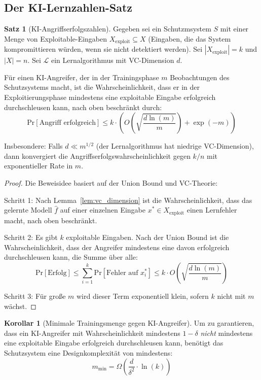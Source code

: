 \documentclass[a4paper,12pt]{article}
\theoremstyle{definition}
\newtheorem{satz}{Satz}
\newtheorem{korollar}{Korollar}
\begin{document}
\subsection{Der KI-Lernzahlen-Satz}

\begin{satz}[KI-Angriffserfolgszahlen]
\label{satz:ki_lernschranke}
Gegeben sei ein Schutzmsystem $S$ mit einer Menge von Exploitable-Eingaben $X_{\mathrm{exploit}} \subseteq X$ (Eingaben, die das System kompromittieren würden, wenn sie nicht detektiert werden). Sei $|X_{\mathrm{exploit}}| = k$ und $|X| = n$. Sei $\mathcal{L}$ ein Lernalgorithmus mit VC-Dimension $d$.

Für einen KI-Angreifer, der in der Trainingsphase $m$ Beobachtungen des Schutzsystems macht, ist die Wahrscheinlichkeit, dass er in der Exploitierungsphase mindestens eine exploitable Eingabe erfolgreich durchschleusen kann, nach oben beschränkt durch:
\begin{equation}
\mathrm{Pr}[\text{Angriff erfolgreich}] \leq k \cdot \left( O\left(\sqrt{\frac{d \ln(m)}{m}}\right) + \exp(-m) \right)
\end{equation}

Insbesondere: Falls $d \ll m^{1/2}$ (der Lernalgorithmus hat niedrige VC-Dimension), dann konvergiert die Angriffserfolgswahrscheinlichkeit gegen $k / n$ mit exponentieller Rate in $m$.
\end{satz}

\begin{proof}
Die Beweisidee basiert auf der Union Bound und VC-Theorie:

Schritt 1: Nach Lemma~\ref{lem:vc_dimension} ist die Wahrscheinlichkeit, dass das gelernte Modell $\hat{f}$ auf einer einzelnen Eingabe $x^* \in X_{\mathrm{exploit}}$ einen Lernfehler macht, nach oben beschränkt.

Schritt 2: Es gibt $k$ exploitable Eingaben. Nach der Union Bound ist die Wahrscheinlichkeit, dass der Angreifer mindestens eine davon erfolgreich durchschleusen kann, die Summe über alle:
\begin{equation}
\mathrm{Pr}[\text{Erfolg}] \leq \sum_{i=1}^{k} \mathrm{Pr}[\text{Fehler auf } x_i^*] \leq k \cdot O\left(\sqrt{\frac{d \ln(m)}{m}}\right)
\end{equation}

Schritt 3: Für große $m$ wird dieser Term exponentiell klein, sofern $k$ nicht mit $m$ wächst.
\end{proof}

\begin{korollar}[Minimale Trainingsmenge gegen KI-Angreifer]
Um zu garantieren, dass ein KI-Angreifer mit Wahrscheinlichkeit mindestens $1 - \delta$ \emph{nicht} mindestens eine exploitable Eingabe erfolgreich durchschleusen kann, benötigt das Schutzsystem eine Designkomplexität von mindestens:
\begin{equation}
m_{\mathrm{min}} = \Omega\left(\frac{d}{\delta^2} \cdot \ln(k)\right)
\end{equation}
\end{korollar}
\end{document}
